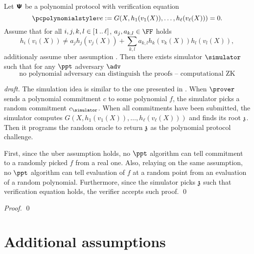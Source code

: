 \documentclass[runningheads,11pt]{llncs}
\begin{document}
\begin{lemma}
  Let $\bm{\mathsf{\Psi}}$ be a polynomial protocol with verification equation
  \[
    \vereq := G(X, h_1(v_1(X)), \ldots, h_\ell(v_\ell (X))) = 0.
  \]
  Assume that for all $i, j, k, l \in [1 \, .. \, \ell]$, $a_j, a_{k, l} \in \FF$ holds
  \[
    h_i(v_i(X)) \neq a_j h_j(v_j(X)) + \sum_{k, l} a_{k, l} h_k(v_k (X)) h_l (v_l (X)),
  \]
  additionaly assume uber assumption \cite{}.
  Then there exists simulator $\simulator$ such that for any $\ppt$ adversary
  $\adv$
  \[
    \text{no polynomial adversary can distinguish the proofs -- computational ZK}
  \]
\end{lemma}
\begin{proof}[draft]
  The simulation idea is similar to the one presented in
  \cite{EPRINT:CFFQR20}. When $\prover$ sends a polynomial commitment $c$ to
  some polynomial $f$, the simulator picks a random commitment
  $c_\simulator$. When all commitments have been submitted, the simulator
  computes $ G(X, h_1(v_1(X)), \ldots, h_\ell(v_\ell (X)))$ and finds its root
  $\mathfrak{z}$. Then it programs the random oracle to return $\mathfrak{z}$ as the polynomial
  protocol challenge.

  First, since the uber assumption holds, no $\ppt$ algorithm can tell
  commitment to a randomly picked $f$ from a real one.  Also, relaying on the same assumption, no $\ppt$
  algorithm can tell evaluation of $f$ at a random point from an evaluation of a
  random polynomial.
  Furthermore, since the simulator picks $\mathfrak{z}$ such that verification equation
  holds, the verifier accepts such proof. 
  \qed
\end{proof}

\begin{theorem}
\end{theorem}
\begin{proof}
  \qed
\end{proof}





\appendix
\section{Additional assumptions}
\end{document}
